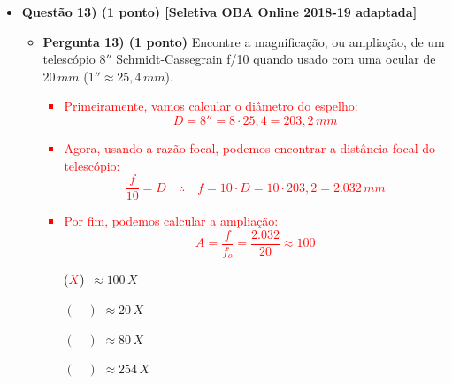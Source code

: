 \documentclass[a4paper, 12pt]{article}
\newcommand{\red}[1]{\textcolor{red}{#1}}
\begin{document}
\begin{flushleft}
\begin{itemize}
            \item \textbf{Questão 13) (1 ponto) [Seletiva OBA Online 2018-19 adaptada]}
                \begin{itemize}
                    \item \textbf{Pergunta 13) (1 ponto)} Encontre a magnificação, ou ampliação, de um telescópio $8''$ Schmidt-Cassegrain f/10 quando usado com uma ocular de $20 \, mm$ ($1'' \approx 25,4 \, mm$).
                        \red{\begin{itemize}
                            \item Primeiramente, vamos calcular o diâmetro do espelho:
                                \begin{equation*}
                                    D = 8 '' = 8 \cdot 25,4 = 203,2 \, mm
                                \end{equation*}
                            \item Agora, usando a razão focal, podemos encontrar a distância focal do telescópio:
                                \begin{equation*}
                                    \frac{f}{10} = D \quad \therefore \quad f = 10 \cdot D = 10 \cdot 203,2 = 2.032 \, mm
                                \end{equation*}
                            \item Por fim, podemos calcular a ampliação:
                                \begin{equation*}
                                    A = \frac{f}{f_o} = \frac{2.032}{20} \approx 100
                                \end{equation*}
                        \end{itemize}}
                        \begin{itemize}
                            \item[$(\red{X})$] $\approx 100 \, X$
                            \item[$(\quad)$] $\approx 20 \, X$
                            \item[$(\quad)$] $\approx 80 \, X$
                            \item[$(\quad)$] $\approx 254 \, X$
                        \end{itemize}
                \end{itemize}
            

\end{itemize}
\end{flushleft}
\end{document}
